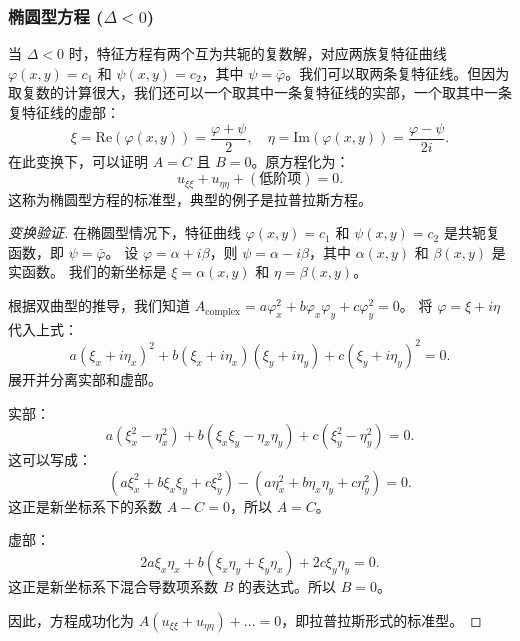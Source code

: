 \documentclass[12pt,a4paper]{article}
\numberwithin{subsection}{section}   %
\numberwithin{subsubsection}{subsection}
\theoremstyle{plain}
\theoremstyle{definition}
\theoremstyle{remark}
\theoremstyle{remark}
\begin{document}
	\subsubsection{椭圆型方程 (\texorpdfstring{$\Delta < 0$}{Delta < 0})}
	当 \(\Delta < 0\) 时，特征方程有两个互为共轭的复数解，对应两族复特征曲线 \(\varphi(x,y) = c_1\) 和 \(\psi(x,y) = c_2\)，其中 \(\psi = \bar{\varphi}\)。我们可以取两条复特征线。但因为取复数的计算很大，我们还可以一个取其中一条复特征线的实部，一个取其中一条复特征线的虚部：
	\[
	\xi = \text{Re}(\varphi(x,y)) = \frac{\varphi+\psi}{2}, \quad \eta = \text{Im}(\varphi(x,y)) = \frac{\varphi-\psi}{2i}.
	\]
	在此变换下，可以证明 \(A=C\) 且 \(B=0\)。原方程化为：
	\begin{equation}\label{eq:elliptic_canonical}
		u_{\xi\xi} + u_{\eta\eta} + (\text{低阶项}) = 0.
	\end{equation}
	这称为椭圆型方程的标准型，典型的例子是拉普拉斯方程。
	
	\begin{proof}[变换验证]
		在椭圆型情况下，特征曲线 \(\varphi(x,y)=c_1\) 和 \(\psi(x,y)=c_2\) 是共轭复函数，即 \(\psi = \bar{\varphi}\)。
		设 \(\varphi = \alpha + i\beta\)，则 \(\psi = \alpha - i\beta\)，其中 \(\alpha(x,y)\) 和 \(\beta(x,y)\) 是实函数。
		我们的新坐标是 \(\xi = \alpha(x,y)\) 和 \(\eta = \beta(x,y)\)。
		
		根据双曲型的推导，我们知道 \(A_\text{complex} = a\varphi_x^2 + b\varphi_x\varphi_y + c\varphi_y^2 = 0\)。
		将 \(\varphi = \xi + i\eta\) 代入上式：
		\[
		a(\xi_x+i\eta_x)^2 + b(\xi_x+i\eta_x)(\xi_y+i\eta_y) + c(\xi_y+i\eta_y)^2 = 0.
		\]
		展开并分离实部和虚部。
		
		实部：
		\[
		a(\xi_x^2-\eta_x^2) + b(\xi_x\xi_y - \eta_x\eta_y) + c(\xi_y^2-\eta_y^2) = 0.
		\]
		这可以写成：
		\[
		(a\xi_x^2 + b\xi_x\xi_y + c\xi_y^2) - (a\eta_x^2 + b\eta_x\eta_y + c\eta_y^2) = 0.
		\]
		这正是新坐标系下的系数 \(A-C=0\)，所以 \(A=C\)。
		
		虚部：
		\[
		2a\xi_x\eta_x + b(\xi_x\eta_y + \xi_y\eta_x) + 2c\xi_y\eta_y = 0.
		\]
		这正是新坐标系下混合导数项系数 \(B\) 的表达式。所以 \(B=0\)。
		
		因此，方程成功化为 \(A(u_{\xi\xi} + u_{\eta\eta}) + \dots = 0\)，即拉普拉斯形式的标准型。
	\end{proof}
	
\end{document}
